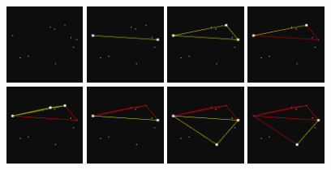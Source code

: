 \documentclass[]{article}
\begin{document}
\begin{figure}[H]
	\includegraphics[width=2.5cm]{qh2d/demo2d/frame0.png}
	\includegraphics[width=2.5cm]{qh2d/demo2d/frame1.png}
	\includegraphics[width=2.5cm]{qh2d/demo2d/frame2.png}
	\includegraphics[width=2.5cm]{qh2d/demo2d/frame3.png}
	\includegraphics[width=2.5cm]{qh2d/demo2d/frame4.png}
	\includegraphics[width=2.5cm]{qh2d/demo2d/frame5.png}
	\includegraphics[width=2.5cm]{qh2d/demo2d/frame6.png}
	\includegraphics[width=2.5cm]{qh2d/demo2d/frame7.png}

\end{figure}
\end{document}
